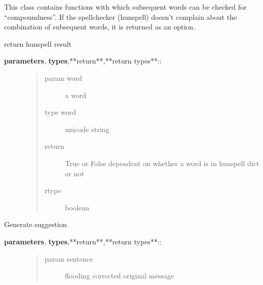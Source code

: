 \documentclass[letterpaper,10pt,english]{sphinxmanual}
\begin{document}
\begin{fulllineitems}
\label{API:norm.modules.compound.Compound}
This class contains functions with which subsequent words can be checked for ``compoundness''.
If the spellchecker (hunspell) doesn't complain about the combination of subsequent words,
it is returned as an option.

\begin{fulllineitems}
\label{API:norm.modules.compound.Compound.check_hunspell}
return hunspell result
\begin{description}
\item[{\textbf{parameters}, \textbf{types},**return**,**return types**::}] \leavevmode\begin{quote}\begin{description}
\item[{param word}] \leavevmode
a word

\item[{type word}] \leavevmode
unicode string

\item[{return}] \leavevmode
True or False dependent on whether a word is in hunspell dict or not

\item[{rtype}] \leavevmode
boolean

\end{description}\end{quote}

\end{description}

\end{fulllineitems}


\begin{fulllineitems}
\label{API:norm.modules.compound.Compound.generate_alternatives}
Generate suggestion
\begin{description}
\item[{\textbf{parameters}, \textbf{types},**return**,**return types**::}] \leavevmode\begin{quote}\begin{description}
\item[{param sentence}] \leavevmode
flooding corrected original message


\end{description}
\end{quote}
\end{description}
\end{fulllineitems}
\end{fulllineitems}
\end{document}

